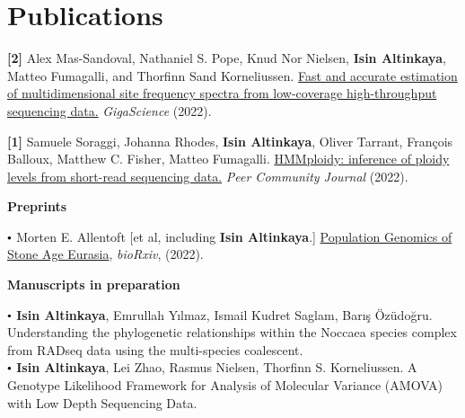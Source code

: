 \documentclass[letterpaper,10.5pt]{article}
\newcommand\sbullet[1][.5]{\mathbin{\vcenter{\hbox{\scalebox{#1}{$\bullet$}}}}}
\begin{document}
\section{Publications}


\textbf{[2]} \hspace{0.42cm} Alex Mas-Sandoval, Nathaniel S. Pope, Knud Nor Nielsen, \textbf{Isin Altinkaya}, Matteo Fumagalli, and Thorfinn Sand Korneliussen. \href{https://doi.org/10.1093/gigascience/giac032}{Fast and accurate estimation of multidimensional site frequency spectra from low-coverage high-throughput sequencing data.} \textit{GigaScience} (2022).

\smallskip


\textbf{[1]} \hspace{0.42cm} Samuele Soraggi, Johanna Rhodes, \textbf{Isin Altinkaya}, Oliver Tarrant, François Balloux, Matthew C. Fisher, Matteo Fumagalli. \href{https://doi.org/10.24072/pcjournal.178}{HMMploidy: inference of ploidy levels from short-read sequencing data.} \textit{Peer Community Journal} (2022).\\
\medskip

\hspace{0.2cm} \textbf{Preprints} \\
\medskip

$\sbullet[.6]$ \hspace{0.74cm}  Morten E. Allentoft [et al, including \textbf{Isin Altinkaya}.]  \href{https://www.biorxiv.org/content/10.1101/2022.05.04.490594v5}{Population Genomics of Stone Age Eurasia}, \textit{bioRxiv}, (2022).\\

\medskip

\hspace{0.2cm} \textbf{Manuscripts in preparation} \\
\medskip


$\sbullet[.6]$ \hspace{0.74cm}  \textbf{Isin Altinkaya}, Emrullah Y{\i}lmaz, Ismail Kudret Saglam, Bar{\i}\c{s} \"{O}z\"{u}do\u{g}ru. Understanding the phylogenetic relationships within the Noccaea species complex from RADseq data using the multi-species coalescent. \\

\smallskip
$\sbullet[.6]$ \hspace{0.74cm}  \textbf{Isin Altinkaya}, Lei Zhao, Rasmus Nielsen, Thorfinn S. Korneliussen. A Genotype Likelihood Framework for Analysis of Molecular Variance (AMOVA) with Low Depth Sequencing Data. \\
\end{document}
